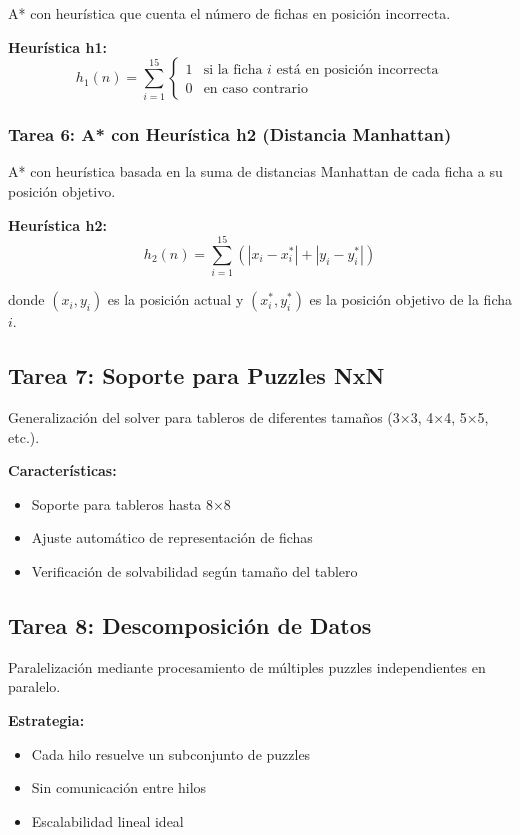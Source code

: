 \documentclass[12pt,a4paper]{article}
\begin{document}
A* con heurística que cuenta el número de fichas en posición incorrecta.

\textbf{Heurística h1:}
\begin{equation}
h_1(n) = \sum_{i=1}^{15} \begin{cases} 
1 & \text{si la ficha } i \text{ está en posición incorrecta} \\
0 & \text{en caso contrario}
\end{cases}
\end{equation}

\subsubsection{Tarea 6: A* con Heurística h2 (Distancia Manhattan)}

A* con heurística basada en la suma de distancias Manhattan de cada ficha a su posición objetivo.

\textbf{Heurística h2:}
\begin{equation}
h_2(n) = \sum_{i=1}^{15} (|x_i - x_i^*| + |y_i - y_i^*|)
\end{equation}

donde $(x_i, y_i)$ es la posición actual y $(x_i^*, y_i^*)$ es la posición objetivo de la ficha $i$.

\subsection{Tarea 7: Soporte para Puzzles NxN}

Generalización del solver para tableros de diferentes tamaños (3×3, 4×4, 5×5, etc.).

\textbf{Características:}
\begin{itemize}
    \item Soporte para tableros hasta 8×8
    \item Ajuste automático de representación de fichas
    \item Verificación de solvabilidad según tamaño del tablero
\end{itemize}

\subsection{Tarea 8: Descomposición de Datos}

Paralelización mediante procesamiento de múltiples puzzles independientes en paralelo.

\textbf{Estrategia:}
\begin{itemize}
    \item Cada hilo resuelve un subconjunto de puzzles
    \item Sin comunicación entre hilos
    \item Escalabilidad lineal ideal
\end{itemize}
\end{document}
